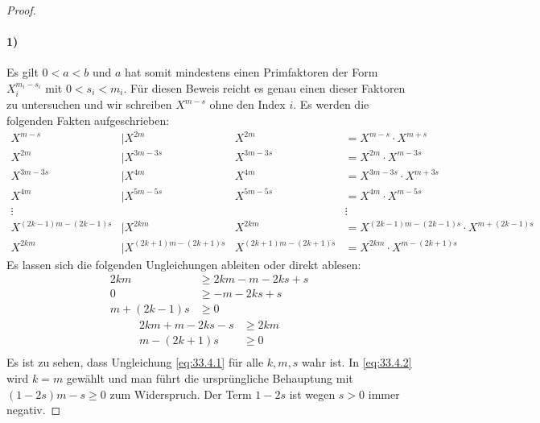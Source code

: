\begin{proof}
  \paragraph{1)}
  Es gilt $0 < a < b$ und $a$ hat somit mindestens einen Primfaktoren
  der Form $X_i^{m_i - s_i}$ mit $0 < s_i < m_i$.
  Für diesen Beweis reicht es genau einen dieser Faktoren zu untersuchen und wir schreiben
  $X^{m - s}$ ohne den Index $i$. Es werden die folgenden Fakten aufgeschrieben:
  \begin{align*}
    X^{m - s}                & \mid X^{2m}                    & X^{2m}                    & = X^{m - s} \cdot X^{m + s}                       \\
    X^{2m}                   & \mid X^{3m - 3s}               & X^{3m - 3s}               & = X^{2m} \cdot X^{m - 3s}                         \\
    X^{3m - 3s}              & \mid X^{4m}                    & X^{4m}                    & = X^{3m - 3s} \cdot X^{m + 3s}                    \\
    X^{4m}                   & \mid X^{5m - 5s}               & X^{5m - 5s}               & = X^{4m} \cdot X^{m - 5s}                         \\
    \vdots                   &                                &                           & \vdots                                            \\
    X^{(2k - 1)m - (2k -1)s} & \mid X^{2km}                   & X^{2km}                   & = X^{(2k - 1)m - (2k -1)s} \cdot X^{m + (2k -1)s} \\
    X^{2km}                  & \mid X^{(2k + 1)m - (2k + 1)s} & X^{(2k + 1)m - (2k + 1)s} & = X^{2km} \cdot X^{m - (2k + 1)s}
  \end{align*}
  Es lassen sich die folgenden Ungleichungen ableiten oder direkt ablesen:
  \begin{equation}
    \label{eq:33.4.1}
    \begin{aligned}
      2km           & \geq 2km - m - 2ks + s \\
      0             & \geq -m - 2ks + s      \\
      m + (2k - 1)s & \geq 0
    \end{aligned}
  \end{equation}
  \begin{equation}
    \label{eq:33.4.2}
    \begin{aligned}
      2km + m - 2ks - s & \geq 2km \\
      m - (2k + 1)s     & \geq 0   \\
    \end{aligned}
  \end{equation}
  \noindent
  Es ist zu sehen, dass Ungleichung \ref{eq:33.4.1} für alle $k,m,s$ wahr ist. In \ref{eq:33.4.2}
  wird $k = m$ gewählt und man führt die ursprüngliche Behauptung mit $(1 - 2s)m -s \geq 0$ zum Widerspruch.
  Der Term $1 - 2s$ ist wegen $s > 0$ immer negativ.


\end{proof}

